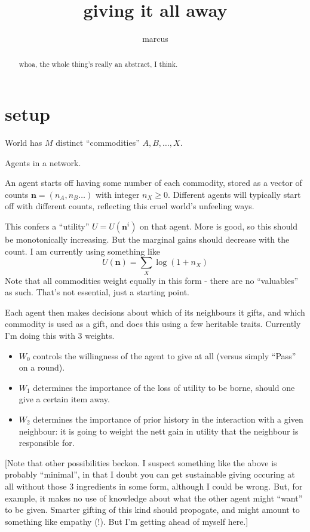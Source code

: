 \documentclass[11pt]{article}
\title{giving it all away}
\author{marcus}
\date{}
\begin{document}
\maketitle

\begin{abstract}
whoa, the whole thing's really an abstract, I think.
\end{abstract}

\section{setup}


World has $M$ distinct ``commodities'' $A, B, \ldots, X$.

Agents in a network. 

An agent starts off having some number of each commodity, stored as a
vector of counts $\mathbf{n} = (n_A, n_B \ldots )$ with integer
$n_X \geq 0$. Different agents will typically start off with different
counts, reflecting this cruel world's unfeeling ways.

This confers a ``utility'' $U = U(\mathbf{n}^i)$ on that agent. More
is good, so this should be monotonically increasing.  But the marginal
gains should decrease with the count. I am currently using something
like
\[
U(\mathbf{n}) = \sum_X \log (1 + n_X)
\]
Note that all commodities weight equally in this form - there are no
``valuables'' as such. That's not essential, just a starting point.

Each agent then makes decisions about which of its neighbours it
gifts, and which commodity is used as a gift, and does this using a
few heritable traits. Currently I'm doing this with 3 weights.
\begin{itemize}
\item $W_0$ controls the willingness of the agent to give at all (versus simply ``Pass'' on a round).
\item $W_1$ determines the importance of the loss of utility to be borne, should one give a certain item away.
\item $W_2$ determines the importance of prior history in the interaction with a given neighbour: it is going to weight the nett gain in utility that the neighbour is responsible for.
\end{itemize}

[Note that other possibilities beckon. I suspect something like the
above is probably ``minimal'', in that I doubt you can get sustainable
giving occuring at all without those 3 ingredients in some form,
although I could be wrong. But, for example, it makes no use of
knowledge about what the other agent might ``want'' to be
given. Smarter gifting of this kind should propogate, and might amount to
something like empathy (!). But I'm getting ahead of myself here.]
\end{document}
